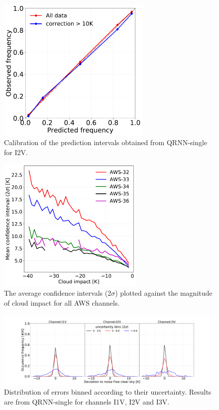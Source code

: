 \documentclass[amt]{copernicus}
\begin{document}
\begin{figure}[t]
	\includegraphics[height = 70mm]{Figures/calibration_QRNN_I2V.pdf}	
	\caption{Calibration of the prediction intervals obtained from QRNN-single for I2V. }
	\label{fig:calibration_I1V}	
\end{figure}
\begin{figure}[t]
	\includegraphics[width = 70mm]{Figures/cloud_impact_uncertainty_AWS.pdf}	
	\caption{The average confidence intervals (2$\sigma$) plotted against the magnitude of cloud impact for all AWS channels.}
	\label{fig:uncertainty_cloud_impact}	
\end{figure}
\begin{figure}[t]
	\includegraphics[width=\textwidth]{Figures/PDF_uncertainty_bins_QRNN-single.pdf}	
	\caption{Distribution of errors binned according to their uncertainty. Results are from QRNN-single for channels I1V, I2V and I3V.}
	\label{fig:error_distribution_uncertainty_bins}	
\end{figure}
\end{document}
